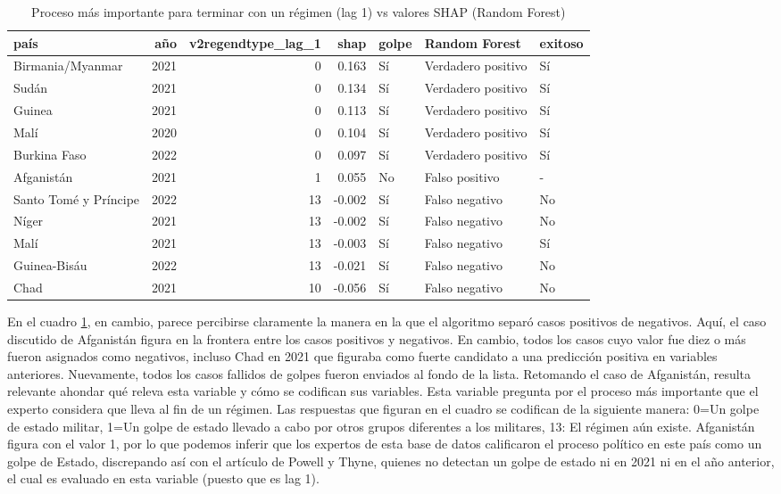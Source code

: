 \documentclass{article}
\begin{document}
\begin{table}[H]
 \centering
 \begin{tabular}{lrrrlll}
  \toprule
  país & año & v2regendtype\_lag\_1 & shap & golpe & Random Forest & exitoso \\
  \midrule
  Birmania/Myanmar & 2021 & 0 & 0.163 & Sí & Verdadero positivo & Sí \\
  Sudán & 2021 & 0 & 0.134 & Sí & Verdadero positivo & Sí \\
  Guinea & 2021 & 0 & 0.113 & Sí & Verdadero positivo & Sí \\
  Malí & 2020 & 0 & 0.104 & Sí & Verdadero positivo & Sí \\
  Burkina Faso & 2022 & 0 & 0.097 & Sí & Verdadero positivo & Sí \\
  Afganistán & 2021 & 1 & 0.055 & No & Falso positivo & - \\
  Santo Tomé y Príncipe & 2022 & 13 & -0.002 & Sí & Falso negativo & No \\
  Níger & 2021 & 13 & -0.002 & Sí & Falso negativo & No \\
  Malí & 2021 & 13 & -0.003 & Sí & Falso negativo & Sí \\
  Guinea-Bisáu & 2022 & 13 & -0.021 & Sí & Falso negativo & No \\
  Chad & 2021 & 10 & -0.056 & Sí & Falso negativo & No \\
  \bottomrule
  \end{tabular}
\caption{Proceso más importante para terminar con un régimen (lag 1) vs valores 
     SHAP (Random Forest) \label{tab:shap_rf_regend}}
\end{table}

En el cuadro \ref{tab:shap_rf_regend}, en cambio, parece percibirse claramente la manera en la que 
el algoritmo separó casos positivos de negativos. Aquí, el caso discutido de Afganistán figura en la
frontera entre los casos positivos y negativos. En cambio, todos los casos cuyo valor fue diez o más
fueron asignados como negativos, incluso Chad en 2021 que figuraba como fuerte candidato a una 
predicción positiva en variables anteriores. Nuevamente, todos los casos fallidos de golpes fueron
enviados al fondo de la lista. Retomando el caso de Afganistán, resulta relevante ahondar qué releva
esta variable y cómo se codifican sus variables. Esta variable pregunta por el proceso más 
importante que el experto considera que lleva al fin de un régimen\cite{CopMet24}. Las respuestas que 
figuran en el cuadro se codifican de la siguiente manera: 0=Un golpe de estado militar, 1=Un golpe de 
estado llevado a cabo por otros grupos diferentes a los militares, 13: El régimen aún existe. Afganistán
figura con el valor 1, por lo que podemos inferir que los expertos de esta base de datos calificaron
el proceso político en este país como un golpe de Estado, discrepando así con el artículo de Powell y 
Thyne, quienes no detectan un golpe de estado ni en 2021 ni en el año anterior, el cual es evaluado
en esta variable (puesto que es lag 1).
\end{document}
